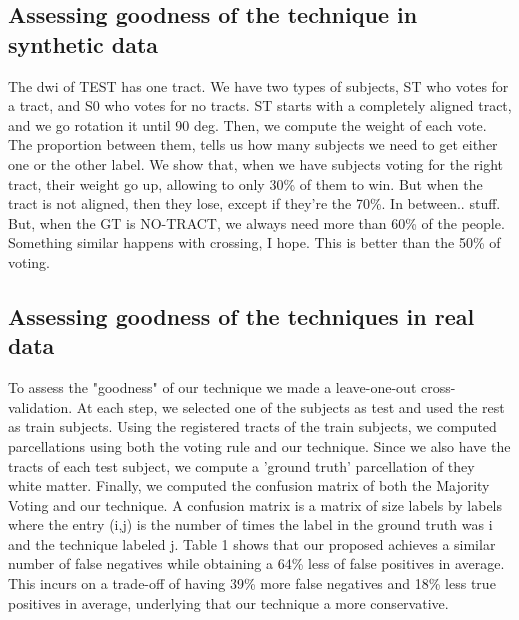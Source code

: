 \subsection{Assessing goodness of the technique in synthetic data}
The dwi of TEST has one tract. We have two types of subjects, ST who votes for
a tract, and S0 who votes for no tracts. ST starts with a completely aligned
tract, and we go rotation it until 90 deg. Then, we compute the weight of
each vote. The proportion between them, tells us how many subjects we need to
get either one or the other label. We show that, when we have subjects voting
for the right tract, their weight go up, allowing to only 30\% of them to win.
But when the tract is not aligned, then they lose, except if they're the 70\%.
In between.. stuff.
But, when the GT is NO-TRACT, we always need more than 60\% of the people.
Something similar happens with crossing, I hope.
This is better than the 50\% of voting.

\subsection{Assessing goodness of the techniques in real data}
To assess the "goodness" of our technique we made a leave-one-out
cross-validation. At each step, we selected one of the subjects as test and 
used the rest as train subjects. Using the registered tracts of the train
subjects, we computed parcellations using both the voting rule and our technique.
Since we also have the tracts of each test subject, we compute a 'ground truth'
parcellation of they white matter. Finally, we computed the confusion matrix of
both the Majority Voting and our technique. A confusion matrix is a matrix of 
size labels by labels where the entry (i,j) is the number of times the label in
the ground truth was i and the technique labeled j. Table 1 shows that our
proposed achieves a similar number of false negatives while obtaining a 64\%
less of false positives in average. This incurs on a trade-off of having 39\%
more false negatives and 18\% less true positives in average, underlying that
our technique a more conservative.\\

